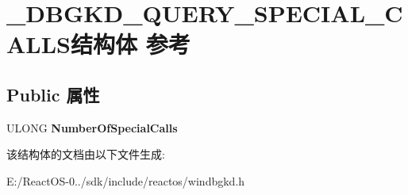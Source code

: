 \hypertarget{struct___d_b_g_k_d___q_u_e_r_y___s_p_e_c_i_a_l___c_a_l_l_s}{}\section{\+\_\+\+D\+B\+G\+K\+D\+\_\+\+Q\+U\+E\+R\+Y\+\_\+\+S\+P\+E\+C\+I\+A\+L\+\_\+\+C\+A\+L\+L\+S结构体 参考}
\label{struct___d_b_g_k_d___q_u_e_r_y___s_p_e_c_i_a_l___c_a_l_l_s}
\subsection*{Public 属性}
\begin{DoxyCompactItemize}
\item 
\mbox{\label{struct___d_b_g_k_d___q_u_e_r_y___s_p_e_c_i_a_l___c_a_l_l_s_af8e30d54d667ecf4d2fa12ba6d3c3a1f}} 
U\+L\+O\+NG {\bfseries Number\+Of\+Special\+Calls}
\end{DoxyCompactItemize}


该结构体的文档由以下文件生成\+:\begin{DoxyCompactItemize}
\item 
E\+:/\+React\+O\+S-\/0../sdk/include/reactos/windbgkd.\+h\end{DoxyCompactItemize}
